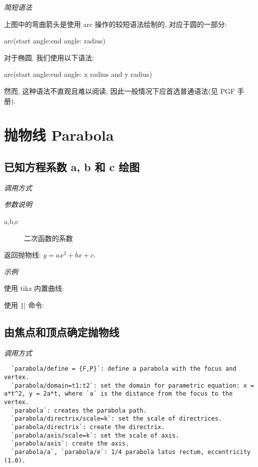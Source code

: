 \emph{简短语法}

上图中的弯曲箭头是使用 arc 操作的较短语法绘制的, 对应于圆的一部分:

arc(start angle:end angle: radius)

对于椭圆, 我们使用以下语法: 

arc(start angle:end angle: x radius and y radius)

然而, 这种语法不直观且难以阅读, 因此一般情况下应首选普通语法(见 PGF 手册).

\section{抛物线 Parabola}

\subsection{已知方程系数 a, b 和 c 绘图}

\emph{调用方式}

\begin{tcolorbox}{}
\end{tcolorbox}

\emph{参数说明}

\begin{description}
  \item[a,b,c] 二次函数的系数
\end{description}

返回抛物线: $y=ax^2+bx+c$.

\emph{示例}

使用 tikz 内置曲线:


使用 \texttt|\parabola| 命令:


\subsection{由焦点和顶点确定抛物线}

\emph{调用方式}

\begin{verbatim}
  `parabola/define = {F,P}`: define a parabola with the focus and vertex.
  `parabola/domain=t1:t2`: set the domain for parametric equation: x = a*t^2, y = 2a*t, where `a` is the distance from the focus to the vertex.
  `parabola`: creates the parabola path.
  `parabola/directrix/scale=k`: set the scale of directrices.
  `parabola/directrix`: create the directrix.
  `parabola/axis/scale=k`: set the scale of axis.
  `parabola/axis`: create the axis.
  `parabola/a`, `parabola/e`: 1/4 parabola latus rectum, eccentricity (1.0).
\end{verbatim}

